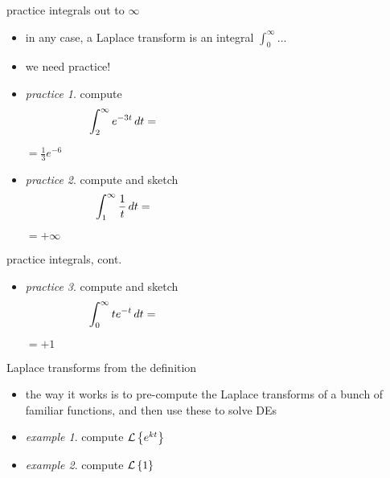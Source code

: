 \documentclass[urlcolor=blue,dvipsnames]{beamer}
\begin{document}
\begin{frame}{practice integrals out to $\infty$}

\begin{itemize}
\item in any case, a Laplace transform is an integral $\int_0^\infty \dots$
\item we need practice!
\item \emph{practice 1}.  compute
    $$\int_2^\infty e^{-3t}\,dt = \hspace{60mm}$$

\vspace{10mm}
\hfill $=\frac{1}{3} e^{-6}$
\item \emph{practice 2}.  compute and sketch
    $$\int_1^\infty \frac{1}{t}\,dt = \hspace{60mm}$$

\vspace{10mm}
\hfill $=+\infty$
\end{itemize}
\end{frame}


\begin{frame}{practice integrals, cont.}

\begin{itemize}
\item \emph{practice 3}.  compute and sketch
    $$\int_0^\infty t e^{-t}\,dt = \hspace{60mm}$$

\vspace{20mm}
\hfill $=+1$

\vspace{10mm}
\end{itemize}
\end{frame}


\begin{frame}{Laplace transforms from the definition}

\begin{itemize}
\item the way it works is to pre-compute the Laplace transforms of a bunch of familiar functions, and then use these to solve DEs
\item \emph{example 1}.  compute $\mathcal{L}\left\{e^{kt}\right\}$

\vspace{30mm}
\item \emph{example 2}.  compute $\mathcal{L}\left\{1\right\}$

\vspace{25mm}
\end{itemize}
\end{frame}
\end{document}

